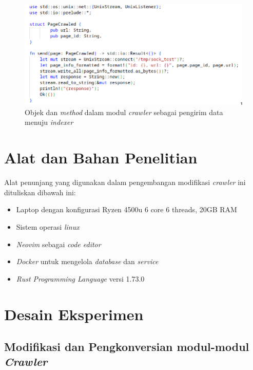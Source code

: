 \begin{figure}[H]
	\centering
	\includegraphics[keepaspectratio, width=15cm]{gambar/unix-sock-indexing.png}
  \caption{Objek dan \emph{method} dalam modul \emph{crawler} sebagai pengirim data menuju \emph{indexer}}
	\label{gambar:unix_sock_indexer}
\end{figure}

\section{Alat dan Bahan Penelitian}

Alat penunjang yang digunakan dalam pengembangan modifikasi \emph{crawler} ini dituliskan dibawah ini:
\begin{itemize}
  \item Laptop dengan konfigurasi Ryzen 4500u 6 core 6 threads, 20GB RAM
  \item Sistem operasi \emph{linux}
  \item \emph{Neovim} sebagai \emph{code editor}
  \item \emph{Docker} untuk mengelola \emph{database} dan \emph{service}
  \item \emph{Rust Programming Language} versi 1.73.0
\end{itemize}

\section{Desain Eksperimen}

\subsection{Modifikasi dan Pengkonversian modul-modul \emph{Crawler}}

